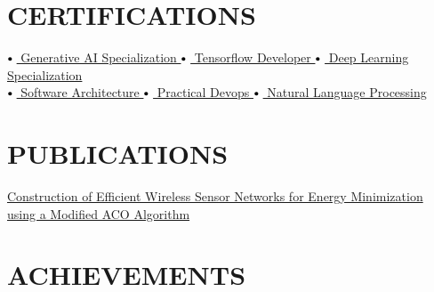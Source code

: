 \documentclass[letterpaper,10pt]{article}
\newcommand\sbullet[1][.5]{\mathbin{\vcenter{\hbox{\scalebox{#1}{$\bullet$}}}}}
\begin{document}
 
\section{CERTIFICATIONS}

$\sbullet[.75] \hspace{0.1cm}${\href{https://www.coursera.org/account/accomplishments/specialization/certificate/HTW6T9JV6TWB}{ Generative AI Specialization \faExternalLink}} \hspace{1cm}
$\sbullet[.75] \hspace{0.1cm}${\href{https://www.coursera.org/account/accomplishments/specialization/certificate/VM84M4KYXB6Y}{ Tensorflow Developer \faExternalLink}} \hspace{1.1cm}
$\sbullet[.75] \hspace{0.1cm}${\href{https://www.coursera.org/account/accomplishments/specialization/certificate/8C3LD42HQ2J6}{ Deep Learning Specialization \faExternalLink}} \\
$\sbullet[.75] \hspace{0.1cm}${\href{https://www.udemy.com/certificate/UC-84855734-1563-4924-ae9a-8da1be5e8bdb/}{ Software Architecture \faExternalLink}} \hspace{2.1cm}
$\sbullet[.75] \hspace{0.1cm}${\href{https://www.udemy.com/certificate/UC-a39907b6-261c-44ec-aa44-9a58cbefebd9/}{ Practical Devops \faExternalLink}} \hspace{1.8cm}
$\sbullet[.75] \hspace{0.1cm}${\href{https://www.coursera.org/account/accomplishments/specialization/certificate/SHTEESHQQ8WR}{ Natural Language Processing \faExternalLink}} \\


\section{PUBLICATIONS}
\noindent
\href{https://doi.org/10.2174/2210327911666210120122610}{Construction of Efficient Wireless Sensor Networks for Energy Minimization using a Modified ACO Algorithm \faExternalLink} 


\section{ACHIEVEMENTS}
\noindent
\end{document}
